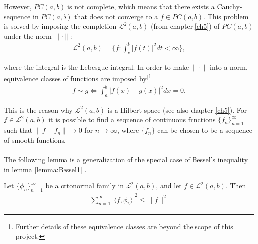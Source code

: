 However, $PC(a,b)$ is not complete, which means that there exists a Cauchy-sequence in $PC(a,b)$ that does not converge to a $f \in PC(a,b)$. This problem is solved by imposing the completion $\mathcal{L}^2(a,b)$ (from chapter \ref{ch5}) of $PC(a,b)$ under the norm $\|\cdot\|$:
\begin{align*}
\mathcal{L}^2(a,b) = \{f: \int_a^b |f(t)|^2 dt < \infty \},
\end{align*}

where the integral is the Lebesgue integral. In order to make $\|\cdot\|$ into a norm, equivalence classes of functions are imposed by$^[$\footnote{Further details of these equivalence classes are beyond the scope of this project.}$^]$
\begin{align*}
f \sim g \Leftrightarrow \int_a^b |f(x) - g(x)|^2 dx = 0.
\end{align*}

This is the reason why $\mathcal{L}^2(a,b)$ is a Hilbert space (see also chapter \ref{ch5}). For $f \in \mathcal{L}^2(a,b)$ it is possible to find a sequence of continuous functions $\{f_n\}_{n=1}^\infty$ such that $\|f - f_n\| \to 0$ for $n \to \infty$, where $\{f_n\}$ can be chosen to be a sequence of smooth functions.
\\ \\
The following lemma is a generalization of the special case of Bessel's inequality in lemma \ref{lemma:Bessel1} \cite{page 75, FAA}.

\begin{lemma} \label{lemma:Bessel2}
Let $\{\phi_n\}_{n=1}^\infty$ be a ortonormal family in $\mathcal{L}^2(a,b)$, and let $f \in \mathcal{L}^2(a,b)$. Then
\begin{align*}
\sum_{n=1}^\infty |\langle f,\phi_n\rangle|^2 \leq \|f\|^2
\end{align*}
\end{lemma}

